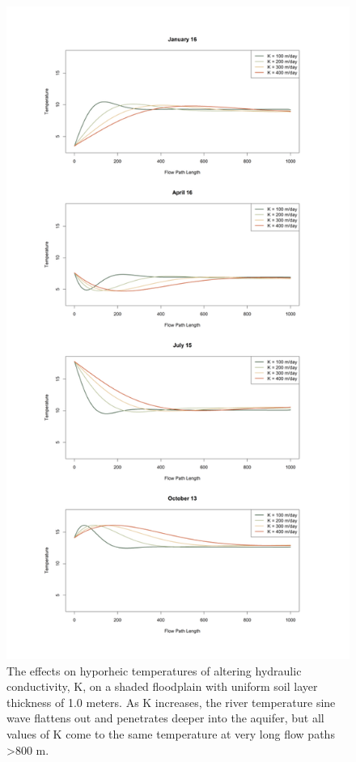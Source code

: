 \documentclass[letterpaper, 11pt]{article}
\begin{document}
\begin{figure}
    \centering
    \includegraphics{Figures/Compare_K_Shady_1.0m.png}
    \caption{The effects on hyporheic temperatures of altering hydraulic conductivity, K, on a shaded floodplain with uniform soil layer thickness of 1.0 meters. As K increases, the river temperature sine wave flattens out and penetrates deeper into the aquifer, but all values of K come to the same temperature at very long flow paths >800 m.}
    \label{fig:CompareK}
\end{figure}
\end{document}
